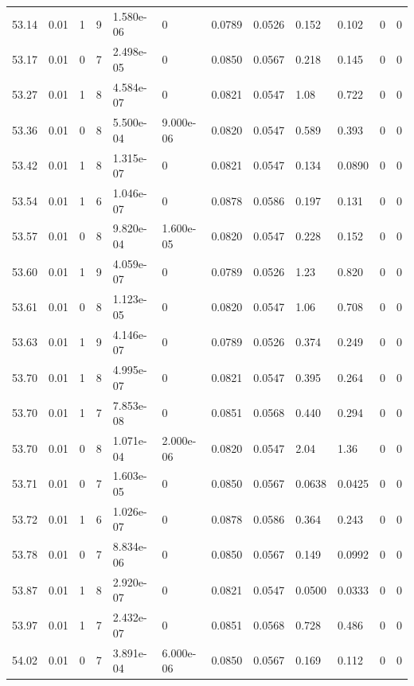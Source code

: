 \documentclass[preview]{standalone}
\begin{document}
{{{{{{{{{{{{{{\begin{tabular}{L{1.2cm}C{1.2cm} C{0.3cm}C{0.5cm} C{1.4cm}C{1.4cm} C{1.4cm}C{1.4cm} C{1.6cm}C{1.6cm} C{1.6cm}C{1.6cm}}
  53.14  &  0.01  & 1     &  9 &  1.580e-06  & 0  &  0.0789&   0.0526& 0.152 & 0.102   &  0 & 0  \\ 
  53.17  &  0.01  & 0     &  7 &  2.498e-05  & 0  &  0.0850&   0.0567& 0.218 & 0.145   &  0 & 0  \\ 
  53.27  &  0.01  & 1     &  8 &  4.584e-07  & 0  &  0.0821&   0.0547& 1.08 & 0.722   &  0 & 0  \\ 
  53.36  &  0.01  & 0     &  8 &  5.500e-04  & 9.000e-06  &  0.0820&   0.0547& 0.589 & 0.393   &  0 & 0  \\ 
  53.42  &  0.01  & 1     &  8 &  1.315e-07  & 0  &  0.0821&   0.0547& 0.134 & 0.0890   &  0 & 0  \\ 
  53.54  &  0.01  & 1     &  6 &  1.046e-07  & 0  &  0.0878&   0.0586& 0.197 & 0.131   &  0 & 0  \\ 
  53.57  &  0.01  & 0     &  8 &  9.820e-04  & 1.600e-05  &  0.0820&   0.0547& 0.228 & 0.152   &  0 & 0  \\ 
  53.60  &  0.01  & 1     &  9 &  4.059e-07  & 0  &  0.0789&   0.0526& 1.23 & 0.820   &  0 & 0  \\ 
  53.61  &  0.01  & 0     &  8 &  1.123e-05  & 0  &  0.0820&   0.0547& 1.06 & 0.708   &  0 & 0  \\ 
  53.63  &  0.01  & 1     &  9 &  4.146e-07  & 0  &  0.0789&   0.0526& 0.374 & 0.249   &  0 & 0  \\ 
  53.70  &  0.01  & 1     &  8 &  4.995e-07  & 0  &  0.0821&   0.0547& 0.395 & 0.264   &  0 & 0  \\ 
  53.70  &  0.01  & 1     &  7 &  7.853e-08  & 0  &  0.0851&   0.0568& 0.440 & 0.294   &  0 & 0  \\ 
  53.70  &  0.01  & 0     &  8 &  1.071e-04  & 2.000e-06  &  0.0820&   0.0547& 2.04 & 1.36   &  0 & 0  \\ 
  53.71  &  0.01  & 0     &  7 &  1.603e-05  & 0  &  0.0850&   0.0567& 0.0638 & 0.0425   &  0 & 0  \\ 
  53.72  &  0.01  & 1     &  6 &  1.026e-07  & 0  &  0.0878&   0.0586& 0.364 & 0.243   &  0 & 0  \\ 
  53.78  &  0.01  & 0     &  7 &  8.834e-06  & 0  &  0.0850&   0.0567& 0.149 & 0.0992   &  0 & 0  \\ 
  53.87  &  0.01  & 1     &  8 &  2.920e-07  & 0  &  0.0821&   0.0547& 0.0500 & 0.0333   &  0 & 0  \\ 
  53.97  &  0.01  & 1     &  7 &  2.432e-07  & 0  &  0.0851&   0.0568& 0.728 & 0.486   &  0 & 0  \\ 
  54.02  &  0.01  & 0     &  7 &  3.891e-04  & 6.000e-06  &  0.0850&   0.0567& 0.169 & 0.112   &  0 & 0  \\ 

\end{tabular}}}}}}}}}}}}}}}
\end{document}
